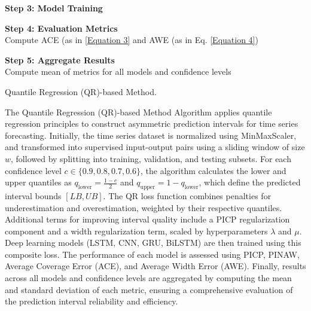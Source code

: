 \begin{itemize}
\begin{algorithm}[H]
        \textbf{Step 3: Model Training}\\
    
        \textbf{Step 4: Evaluation Metrics}\\
        Compute ACE (as in \eqref{Equation 3} and AWE (as in Eq. \eqref{Equation 4})
    
        \textbf{Step 5: Aggregate Results}\\
        Compute mean of metrics for all models and confidence levels
    
        \caption{Quantile Regression (QR)-based Method.}
        \end{algorithm}

        The Quantile Regression (QR)-based Method Algorithm applies quantile regression principles to construct asymmetric prediction intervals for time series forecasting. Initially, the time series dataset is normalized using MinMaxScaler, and transformed into supervised input-output pairs using a sliding window of size $w$, followed by splitting into training, validation, and testing subsets. For each confidence level $c \in \{0.9, 0.8, 0.7, 0.6\}$, the algorithm calculates the lower and upper quantiles as $q_{\text{lower}} = \frac{1 - c}{2}$ and $q_{\text{upper}} = 1 - q_{\text{lower}}$, which define the predicted interval bounds $[LB, UB]$. The QR loss function combines penalties for underestimation and overestimation, weighted by their respective quantiles. Additional terms for improving interval quality include a PICP regularization component and a width regularization term, scaled by hyperparameters $\lambda$ and $\mu$. Deep learning models (LSTM, CNN, GRU, BiLSTM) are then trained using this composite loss. The performance of each model is assessed using PICP, PINAW, Average Coverage Error (ACE), and Average Width Error (AWE). Finally, results across all models and confidence levels are aggregated by computing the mean and standard deviation of each metric, ensuring a comprehensive evaluation of the prediction interval reliability and efficiency.



\end{itemize}

